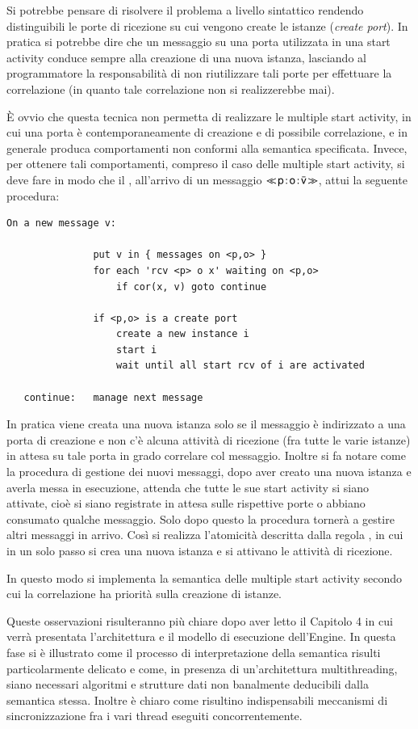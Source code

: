 Si potrebbe pensare di risolvere il problema a livello
sintattico rendendo distinguibili le porte di
ricezione su cui vengono create le istanze (\emph{create port}). In pratica si
potrebbe dire che un messaggio su una porta utilizzata in
una start activity conduce sempre alla creazione di una nuova istanza, lasciando
al programmatore la responsabilità di non riutilizzare tali porte per
effettuare la correlazione (in quanto tale correlazione non si realizzerebbe
mai).

\`E ovvio che questa tecnica non permetta di realizzare le multiple start
activity, in cui una porta è contemporaneamente di creazione e di possibile
correlazione, e in generale produca comportamenti non conformi alla semantica
specificata. Invece, per ottenere tali comportamenti, compreso il caso delle
multiple start activity, si deve fare in modo che il ,
all'arrivo di un messaggio $\ll\!{{\sf p}}\! : \! {\sf o}\! : \! \bar{{\sf v}}\!\gg$,  attui la seguente
procedura:
\begin{verbatim}
On a new message v:

               put v in { messages on <p,o> } 
               for each 'rcv <p> o x' waiting on <p,o>
                   if cor(x, v) goto continue

               if <p,o> is a create port 
                   create a new instance i
                   start i
                   wait until all start rcv of i are activated
               
   continue:   manage next message 
\end{verbatim}

In pratica viene creata una nuova istanza solo se il messaggio è indirizzato a
una porta di creazione e non c'è alcuna attività di ricezione (fra tutte le
varie istanze) in attesa su tale porta in grado correlare col messaggio. Inoltre
si fa notare come la procedura di gestione dei nuovi messaggi, dopo aver creato
una nuova istanza e averla messa in esecuzione, attenda che tutte le sue start
activity si siano attivate, cioè si siano registrate in attesa sulle rispettive
porte o abbiano consumato qualche messaggio. Solo dopo questo la procedura
tornerà a gestire altri messaggi in arrivo. Così si realizza
l'atomicità descritta dalla regola , in cui in un solo passo si
crea una nuova istanza e si attivano le attività di ricezione. 

In questo modo si implementa la semantica delle multiple start activity secondo
cui la correlazione ha priorità sulla creazione di istanze.

Queste osservazioni risulteranno più chiare dopo aver letto il Capitolo 4 in cui
verrà presentata l'architettura e il modello di esecuzione dell'Engine. In questa
fase si è illustrato come il processo di interpretazione della semantica risulti
particolarmente delicato e come, in presenza di un'architettura multithreading,
siano necessari algoritmi e strutture dati non banalmente deducibili dalla
semantica stessa. Inoltre è chiaro come risultino indispensabili meccanismi di
sincronizzazione fra i vari thread eseguiti concorrentemente.


 


